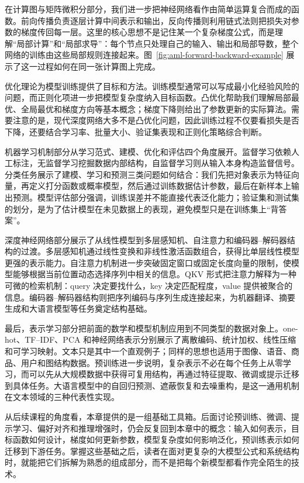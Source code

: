 在计算图与矩阵微积分部分，我们进一步把神经网络看作由简单运算复合而成的函数。前向传播负责逐层计算中间表示和输出，反向传播则利用链式法则把损失对参数的梯度传回每一层。这里的核心思想不是记住某一个复杂梯度公式，而是理解“局部计算”和“局部求导”：每个节点只处理自己的输入、输出和局部导数，整个网络的训练由这些局部规则连接起来。图~\ref{fig:aml-forward-backward-example} 展示了这一过程如何在同一张计算图上完成。

优化理论为模型训练提供了目标和方法。训练模型通常可以写成最小化经验风险的问题，而正则化项进一步把模型复杂度纳入目标函数。凸优化帮助我们理解局部最优、全局最优和梯度方向等基本概念；梯度下降则给出了参数更新的实际算法。需要注意的是，现代深度网络大多不是凸优化问题，因此训练过程不仅要看损失是否下降，还要结合学习率、批量大小、验证集表现和正则化策略综合判断。

机器学习机制部分从学习范式、建模、优化和评估四个角度展开。监督学习依赖人工标注，无监督学习挖掘数据内部结构，自监督学习则从输入本身构造监督信号。分类任务展示了建模、学习和预测三类问题如何结合：我们先把对象表示为特征向量，再定义打分函数或概率模型，然后通过训练数据估计参数，最后在新样本上输出预测。模型评估部分强调，训练误差并不能直接代表泛化能力；验证集和测试集的划分，是为了估计模型在未见数据上的表现，避免模型只是在训练集上“背答案”。

深度神经网络部分展示了从线性模型到多层感知机、自注意力和编码器--解码器结构的过渡。多层感知机通过线性变换和非线性激活函数组合，获得比单层线性模型更强的表示能力。自注意力机制进一步突破固定窗口或固定长度向量的限制，使模型能够根据当前位置动态选择序列中相关的信息。QKV 形式把注意力解释为一种可微的检索机制：query 决定要找什么，key 决定匹配程度，value 提供被聚合的信息。编码器--解码器结构则把序列编码与序列生成连接起来，为机器翻译、摘要生成和大语言模型等任务奠定结构基础。

最后，表示学习部分把前面的数学和模型机制应用到不同类型的数据对象上。one-hot、TF--IDF、PCA 和神经网络表示分别展示了离散编码、统计加权、线性压缩和可学习映射。文本只是其中一个直观例子；同样的思想也适用于图像、语音、商品、用户和图结构数据。预训练进一步说明，复杂表示不必在每个任务上从零学习，而可以先从大规模数据中获得可复用结构，再通过特征提取、微调或提示迁移到具体任务。大语言模型中的自回归预测、遮蔽恢复和去噪重构，是这一通用机制在文本领域的三种代表性实现。

从后续课程的角度看，本章提供的是一组基础工具箱。后面讨论预训练、微调、提示学习、偏好对齐和推理增强时，仍会反复回到本章中的概念：输入如何表示，目标函数如何设计，梯度如何更新参数，模型复杂度如何影响泛化，预训练表示如何迁移到下游任务。掌握这些基础之后，读者在面对更复杂的大模型公式和系统结构时，就能把它们拆解为熟悉的组成部分，而不是把每个新模型都看作完全陌生的技术。

